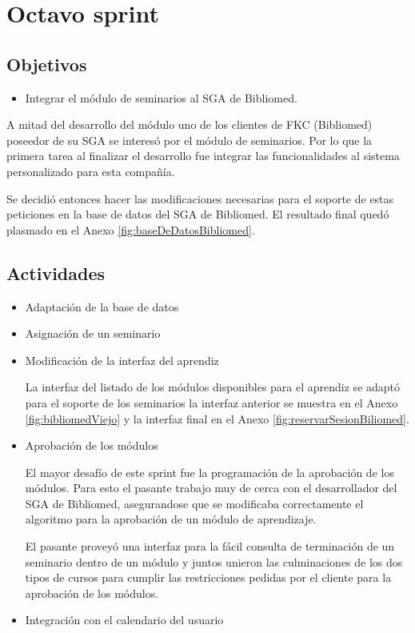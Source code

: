 \section{Octavo sprint} %
\label{sec:octavo_sprint}

\subsection{Objetivos}

\begin{itemize}
	\item Integrar el módulo de seminarios al SGA de Bibliomed.
\end{itemize}

A mitad del desarrollo del módulo uno de los clientes de FKC (Bibliomed) poseedor de su SGA se interesó por el módulo de seminarios. Por lo que la primera tarea al finalizar el desarrollo fue integrar las funcionalidades al sistema personalizado para esta compañía.

Se decidió entonces hacer las modificaciones necesarias para el soporte de estas peticiones en la base de datos del SGA de Bibliomed. El resultado final quedó plasmado en el Anexo \ref{fig:baseDeDatosBibliomed}.

\subsection{Actividades} %
\label{sub:actividades8}

\begin{itemize}

\item Adaptación de la base de datos

\item Asignación de un seminario

\item Modificación de la interfaz del aprendiz

La interfaz del listado de los módulos disponibles para el aprendiz se adaptó para el soporte de los seminarios la interfaz anterior se muestra en el Anexo \ref{fig:bibliomedViejo} y la interfaz final en el Anexo \ref{fig:reservarSesionBiliomed}.

\item Aprobación de los módulos

El mayor desafío de este sprint fue la programación de la aprobación de los módulos. Para esto el pasante trabajo muy de cerca con el desarrollador del SGA de Bibliomed, asegurandose que se modificaba correctamente el algoritmo para la aprobación de un módulo de aprendizaje.

El pasante proveyó una interfaz para la fácil consulta de terminación de un seminario dentro de un módulo y juntos unieron las culminaciones de los dos tipos de cursos para cumplir las restricciones pedidas por el cliente para la aprobación de los módulos.

\item Integración con el calendario del usuario

\end{itemize}


